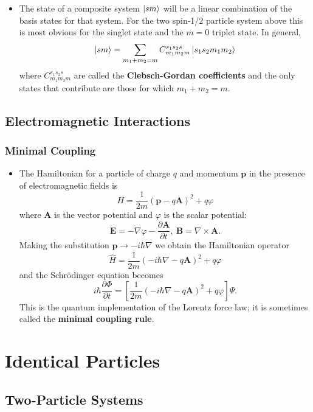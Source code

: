 \documentclass{article}
\renewcommand{\vec}[1]{\boldsymbol{\mathbf{#1}}}
\begin{document}
\begin{itemize}
  \item The state of a composite system $\ket{s m}$ will be a linear combination of the basis states for that system. For the two spin-1/2 particle system above this is most obvious for the singlet state and the $m = 0$ triplet state. In general, \[\ket{s m} = \sum_{m_1 + m_2 = m} C_{m_1 m_2 m}^{s_1 s_2 s} \ket{s_1 s_2 m_1 m_2}\] where $C_{m_1 m_2 m}^{s_1 s_2 s}$ are called the \textbf{Clebsch-Gordan coefficients} and the only states that contribute are those for which $m_1 + m_2 = m$.
\end{itemize}

\subsection{Electromagnetic Interactions}

\subsubsection{Minimal Coupling}

\begin{itemize}
  \item The Hamiltonian for a particle of charge $q$ and momentum $\vec{p}$ in the presence of electromagnetic fields is \[H = \frac{1}{2 m} (\vec{p} - q \vec{A})^2 + q \varphi\] where $\vec{A}$ is the vector potential and $\varphi$ is the scalar potential: \[\vec{E} = -\nabla \varphi - \frac{\partial \vec{A}}{\partial t}, \ \vec{B} = \nabla \times \vec{A}.\] Making the substitution $\vec{p} \rightarrow -i \hbar \nabla$ we obtain the Hamiltonian operator \[\hat{H} = \frac{1}{2 m} (-i \hbar \nabla - q \vec{A})^2 + q \varphi\] and the Schrödinger equation becomes \[i \hbar \frac{\partial \Phi}{\partial t} = \left[ \frac{1}{2 m} (-i \hbar \nabla - q \vec{A})^2 + q \varphi \right] \Psi.\] This is the quantum implementation of the Lorentz force law; it is sometimes called the \textbf{minimal coupling rule}.
\end{itemize}

\section{Identical Particles}

\subsection{Two-Particle Systems}
\end{document}
